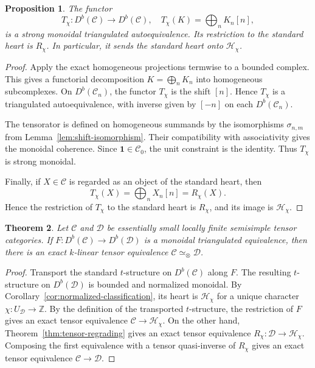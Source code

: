 \documentclass[11pt]{amsart}
\newcommand{\C}{\mathcal C}
\newcommand{\D}{\mathcal D}
\newcommand{\Hh}{\mathcal H}
\newcommand{\one}{\mathbf 1}
\newtheorem{theorem}{Theorem}[section]
\newtheorem{proposition}[theorem]{Proposition}
\theoremstyle{definition}
\theoremstyle{remark}
\theoremstyle{plain}
\begin{document}
\begin{proposition}\label{prop:derived-regrading}
The functor
\[
T_\chi: D^b(\C)\rightarrow D^b(\C),\quad T_\chi(K)=\bigoplus_n K_n[n],
\]
is a strong monoidal triangulated autoequivalence. Its restriction to the standard heart is $R_\chi$. In particular, it sends the standard heart onto $\Hh_\chi$.
\end{proposition}

\begin{proof}
Apply the exact homogeneous projections termwise to a bounded complex. This gives a functorial decomposition $K=\bigoplus_n K_n$ into homogeneous subcomplexes. On $D^b(\C_n)$, the functor $T_\chi$ is the shift $[n]$. Hence $T_\chi$ is a triangulated autoequivalence, with inverse given by $[-n]$ on each $D^b(\C_n)$.

The tensorator is defined on homogeneous summands by the isomorphisms $\sigma_{n,m}$ from Lemma~\ref{lem:shift-isomorphism}. Their compatibility with associativity gives the monoidal coherence. Since $\one\in\C_0$, the unit constraint is the identity. Thus $T_\chi$ is strong monoidal.

Finally, if $X\in\C$ is regarded as an object of the standard heart, then
\[
T_\chi(X)=\bigoplus_n X_n[n]=R_\chi(X).
\]
Hence the restriction of $T_\chi$ to the standard heart is $R_\chi$, and its image is $\Hh_\chi$.
\end{proof}


\begin{theorem}\label{thm:tensor-reconstruction}
Let $\C$ and $\D$ be essentially small locally finite semisimple tensor categories. If $F: D^b(\C)\to D^b(\D)$ is a monoidal triangulated equivalence, then there is an exact $k$-linear tensor equivalence $\C\simeq_\otimes\D$.
\end{theorem}

\begin{proof}
Transport the standard $t$-structure on $D^b(\C)$ along $F$. The resulting $t$-structure on $D^b(\D)$ is bounded and normalized monoidal. By Corollary~\ref{cor:normalized-classification}, its heart is $\Hh_\chi$ for a unique character $\chi: U_{\D}\to\mathbb Z$. By the definition of the transported $t$-structure, the restriction of $F$ gives an exact tensor equivalence $\C\rightarrow\Hh_\chi$. On the other hand, Theorem~\ref{thm:tensor-regrading} gives an exact tensor equivalence $R_\chi:\D\rightarrow\Hh_\chi$. Composing the first equivalence with a tensor quasi-inverse of $R_\chi$ gives an exact tensor equivalence $\C\to\D$.
\end{proof}
\end{document}
